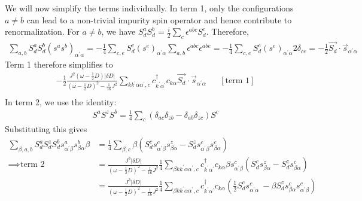 \documentclass[12pt]{article}
\begin{document}
We will now simplify the terms individually. In term 1, only the configurations \(a \neq b\) can lead to a non-trivial impurity spin operator and hence contribute to renormalization. For \(a \neq b\), we have \(S_d^a S_d^b = \frac{i}{2} \sum_c \epsilon^{abc}S_d^c \). Therefore,
\begin{equation}\begin{aligned}
\sum_{a,b}S_d^a S_d^b\left(s^a s^b\right)_{\alpha^\prime \alpha} = - \frac{1}{4}\sum_{c,e} S_d^c \left(s^e\right)_{\alpha^\prime \alpha}\sum_{a,b}\epsilon^{abc}\epsilon^{abe} = - \frac{1}{4}\sum_{c,e} S_d^c \left(s^e\right)_{\alpha^\prime \alpha} 2 \delta_{ce} = -\frac{1}{2}\vec{S_d}\cdot\vec{s}_{\alpha^\prime \alpha}
\end{aligned}\end{equation}
Term 1 therefore simplifies to
\begin{equation}\begin{aligned}
	-\frac{1}{2}\frac{J^2\left(\omega - \frac{1}{2}D\right)|\delta D|}{\left(\omega - \frac{1}{2}D\right)^2 - \frac{1}{16}J^2} \sum_{k k^\prime \alpha \alpha^\prime,c} c^\dagger_{k^\prime\alpha^\prime} c_{k\alpha} \vec{S_d}\cdot\vec{s}_{\alpha^\prime \alpha} && \left[\text{term 1}\right]\\
\end{aligned}\end{equation}
In term 2, we use the identity:
\begin{equation}\begin{aligned}
S^a S^z S^b = \frac{1}{4}\sum_c \left(\delta_{ac}\delta_{zb} - \delta_{ab}\delta_{zc}\right) S^c
\end{aligned}\end{equation}
Substituting this gives
\begin{equation}\begin{aligned}
	\sum_{\beta,a,b} S_d^a S_d^z S_d^b s^a_{\alpha^\prime \beta} s^b_{\beta \alpha} \beta &= \frac{1}{4}\sum_{\beta,c}\beta \left(S_d^c s^c_{\alpha^\prime\beta}s^z_{\beta\alpha} - S_d^z s^c_{\alpha^\prime\beta} s^c_{\beta\alpha}\right) \\
	\implies \text{term 2} &= \frac{J^3|\delta D|}{\left(\omega - \frac{1}{2}D\right)^2 - \frac{1}{16}J^2} \frac{1}{4}\sum_{\beta k k^\prime \alpha \alpha^\prime,c} c^\dagger_{k^\prime\alpha^\prime} c_{k\alpha} \beta s^c_{\alpha^\prime\beta}\left(S_d^c s^z_{\beta\alpha} - S_d^z s^c_{\beta\alpha}\right)\\
			       &= \frac{J^3|\delta D|}{\left(\omega - \frac{1}{2}D\right)^2 - \frac{1}{16}J^2} \frac{1}{4}\sum_{\beta k k^\prime \alpha \alpha^\prime,c} c^\dagger_{k^\prime\alpha^\prime} c_{k\alpha} \left(\frac{1}{2}S_d^c s^c_{\alpha^\prime\alpha}\ - \beta S_d^z s^c_{\beta\alpha}s^c_{\alpha^\prime\beta}\right)
\end{aligned}\end{equation}
\end{document}
